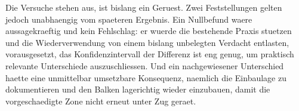 Die Versuche stehen aus,  ist bislang ein Geruest. Zwei
Feststellungen gelten jedoch unabhaengig vom spaeteren Ergebnis. Ein
Nullbefund waere aussagekraeftig und kein Fehlschlag: er wuerde die
bestehende Praxis stuetzen und die Wiederverwendung von einem bislang
unbelegten Verdacht entlasten, vorausgesetzt, das Konfidenzintervall der
Differenz ist eng genug, um praktisch relevante Unterschiede auszuschliessen.
Und ein nachgewiesener Unterschied haette eine unmittelbar umsetzbare
Konsequenz, naemlich die Einbaulage zu dokumentieren und den Balken
lagerichtig wieder einzubauen, damit die vorgeschaedigte Zone nicht erneut
unter Zug geraet.
